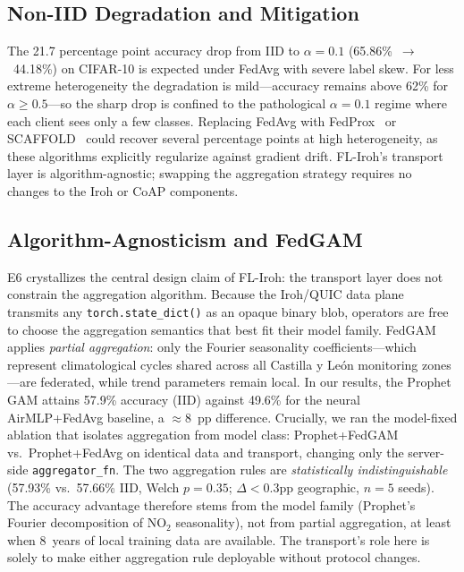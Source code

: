 ﻿\documentclass[journal]{IEEEtran}
\begin{document}
\subsection{Non-IID Degradation and Mitigation}

The 21.7 percentage point accuracy drop from IID to $\alpha{=}0.1$ (65.86\%~$\to$~44.18\%) on CIFAR-10 is expected under FedAvg with severe label skew. For less extreme heterogeneity the degradation is mild---accuracy remains above 62\% for $\alpha{\geq}0.5$---so the sharp drop is confined to the pathological $\alpha{=}0.1$ regime where each client sees only a few classes. Replacing FedAvg with FedProx~\cite{fedprox2020} or SCAFFOLD~\cite{scaffold2020} could recover several percentage points at high heterogeneity, as these algorithms explicitly regularize against gradient drift. FL-Iroh's transport layer is algorithm-agnostic; swapping the aggregation strategy requires no changes to the Iroh or CoAP components.

\subsection{Algorithm-Agnosticism and FedGAM}

E6 crystallizes the central design claim of FL-Iroh: the transport layer does not constrain the aggregation algorithm. Because the Iroh/QUIC data plane transmits any \texttt{torch.state\_dict()} as an opaque binary blob, operators are free to choose the aggregation semantics that best fit their model family. FedGAM applies \emph{partial aggregation}: only the Fourier seasonality coefficients---which represent climatological cycles shared across all Castilla y Le\'on monitoring zones---are federated, while trend parameters remain local. In our results, the Prophet GAM attains 57.9\% accuracy (IID) against 49.6\% for the neural AirMLP+FedAvg baseline, a $\approx$8~pp difference. Crucially, we ran the model-fixed ablation that isolates aggregation from model class: Prophet+FedGAM vs.~Prophet+FedAvg on identical data and transport, changing only the server-side \texttt{aggregator\_fn}. The two aggregation rules are \emph{statistically indistinguishable} (57.93\% vs.~57.66\% IID, Welch $p{=}0.35$; $\Delta{<}0.3$pp geographic, $n{=}5$ seeds). The accuracy advantage therefore stems from the model family (Prophet's Fourier decomposition of NO$_2$ seasonality), not from partial aggregation, at least when 8~years of local training data are available. The transport's role here is solely to make either aggregation rule deployable without protocol changes.
\end{document}
